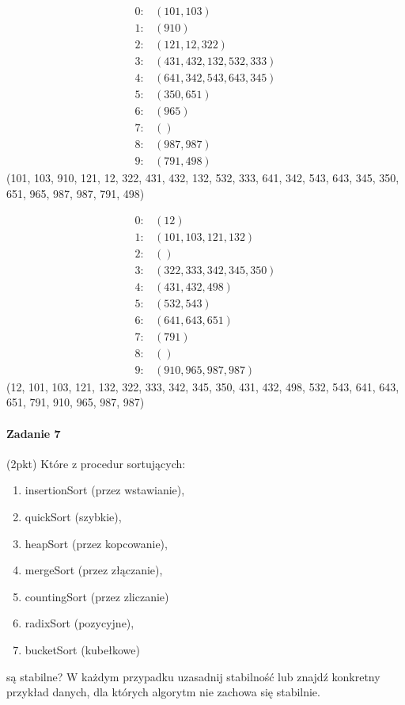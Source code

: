 \documentclass[18pt]{extarticle}
\begin{document}
\begin{align*}
    0: & \left(101, 103\right) \\
    1: & \left(910\right) \\
    2: & \left(121, 12, 322\right) \\
    3: & \left(431, 432, 132, 532, 333\right) \\
    4: & \left(641, 342, 543, 643, 345\right) \\
    5: & \left(350, 651\right) \\
    6: & \left(965\right) \\
    7: & \left(\right) \\
    8: & \left(987, 987\right) \\
    9: & \left(791, 498\right)
\end{align*}
(101, 103, 910, 121, 12, 322, 431, 432, 132, 532, 333, 641, 342, 543, 643, 345, 350, 651, 965, 987, 987, 791, 498)

\begin{align*}
    0: & \left(12\right) \\
    1: & \left(101, 103, 121, 132\right) \\
    2: & \left(\right) \\
    3: & \left(322, 333, 342, 345, 350\right) \\
    4: & \left(431, 432, 498\right) \\
    5: & \left(532, 543\right) \\
    6: & \left(641, 643, 651\right) \\
    7: & \left(791\right) \\
    8: & \left(\right) \\
    9: & \left(910, 965, 987, 987\right)
\end{align*}
(12, 101, 103, 121, 132, 322, 333, 342, 345, 350, 431, 432, 498, 532, 543, 641, 643, 651, 791, 910, 965, 987, 987)

\paragraph{Zadanie 7} (2pkt) Które z procedur sortujących:
\begin{enumerate}
    \item insertionSort (przez wstawianie),
    \item quickSort (szybkie),
    \item heapSort (przez kopcowanie),
    \item mergeSort (przez złączanie),
    \item countingSort (przez zliczanie)
    \item radixSort (pozycyjne),
    \item bucketSort (kubełkowe)
\end{enumerate}
są stabilne? W każdym przypadku uzasadnij stabilność lub znajdź konkretny przykład danych, dla których algorytm nie zachowa się stabilnie.
\end{document}
